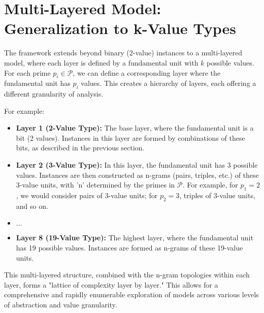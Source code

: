 \section{Multi-Layered Model: Generalization to k-Value Types}
The framework extends beyond binary (2-value) instances to a multi-layered model, where each layer is defined by a fundamental unit with $k$ possible values. For each prime $p_i \in \mathcal{P}$, we can define a corresponding layer where the fundamental unit has $p_i$ values. This creates a hierarchy of layers, each offering a different granularity of analysis.

For example:
\begin{itemize}
    \item \textbf{Layer 1 (2-Value Type):} The base layer, where the fundamental unit is a bit (2 values). Instances in this layer are formed by combinations of these bits, as described in the previous section.
    \item \textbf{Layer 2 (3-Value Type):} In this layer, the fundamental unit has 3 possible values. Instances are then constructed as n-grams (pairs, triples, etc.) of these 3-value units, with 'n' determined by the primes in $\mathcal{P}$. For example, for $p_1=2$, we would consider pairs of 3-value units; for $p_2=3$, triples of 3-value units, and so on.
    \item $\ldots$
    \item \textbf{Layer 8 (19-Value Type):} The highest layer, where the fundamental unit has 19 possible values. Instances are formed as n-grams of these 19-value units.
\end{itemize}
This multi-layered structure, combined with the n-gram topologies within each layer, forms a "lattice of complexity layer by layer." This allows for a comprehensive and rapidly enumerable exploration of models across various levels of abstraction and value granularity.